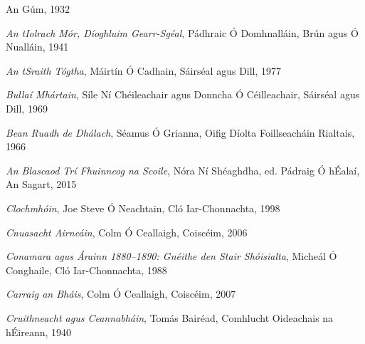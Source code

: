 \documentclass[output=paper,colorlinks,citecolor=brown]{langscibook}
\begin{document}
\begin{description}[leftmargin=!,labelwidth=\widthof{\textsc{agmts:}},font=\normalfont\scshape,noitemsep]
                   An Gúm, 1932
\item[atim:]  \textit{An tIolrach Mór, Díoghluim Gearr-Sgéal}, Pádhraic Ó Domhnalláin, Brún 
                   agus Ó Nualláin, 1941
\item[att:]  \textit{An tSraith Tógtha}, Máirtín Ó Cadhain, Sáirséal agus Dill, 1977
\item[bm:]  \textit{Bullaí Mhártain},  Síle Ní Chéileachair agus Donncha Ó Céilleachair, Sáirséal
                    agus Dill, 1969
\item[brd:]  \textit{Bean Ruadh de Dhálach},  Séamus Ó Grianna, Oifig Díolta Foillseacháin 
                    Rialtais, 1966                                                                        
\item[btfs:]  \textit{An Blascaod Trí Fhuinneog na Scoile}, Nóra Ní Shéaghdha, ed. Pádraig Ó hÉalaí,
                    An Sagart, 2015                                                                       
\item[c:]  \textit{Clochmhóin}, Joe Steve Ó Neachtain, Cló Iar-Chonnachta, 1998 
\item[ca:]  \textit{Cnuasacht Airneáin},  Colm Ó Ceallaigh, Coiscéim, 2006
\item[caa:]  \textit{Conamara agus Árainn 1880--1890: Gnéithe den Stair Shóisialta}, Micheál
                    Ó Conghaile, Cló Iar-Chonnachta, 1988  
\item[cab:]  \textit{Carraig an Bháis}, Colm Ó Ceallaigh, Coiscéim, 2007 
\item[cc:]  \textit{Cruithneacht agus Ceannabháin}, Tomás Bairéad, Comhlucht Oideachais
                    na hÉireann, 1940



\end{description}
\end{document}
